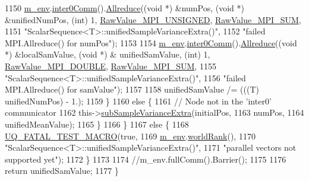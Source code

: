 \begin{DoxyCode}
1150       \hyperlink{class_q_u_e_s_o_1_1_scalar_sequence_a71618cd6351b29361b437af68447a4c8}{m\_env}.\hyperlink{class_q_u_e_s_o_1_1_base_environment_a689e4d140c74d495d97eb498714a4b82}{inter0Comm}().\hyperlink{class_q_u_e_s_o_1_1_mpi_comm_a72e137e60ef8060efb1ee5fc874fa4b8}{Allreduce}((\textcolor{keywordtype}{void} *) &numPos, (\textcolor{keywordtype}{void} *) &unifiedNumPos, (\textcolor{keywordtype}{int})
       1, \hyperlink{_mpi_comm_8h_a06cbfbc33436f6e0dc8a48ff3c49bdfc}{RawValue\_MPI\_UNSIGNED}, \hyperlink{_mpi_comm_8h_afbf78d291c032aa7f512bc566cee2bd1}{RawValue\_MPI\_SUM},
1151                                    \textcolor{stringliteral}{"ScalarSequence<T>::unifiedSampleVarianceExtra()"},
1152                                    \textcolor{stringliteral}{"failed MPI.Allreduce() for numPos"});
1153 
1154       \hyperlink{class_q_u_e_s_o_1_1_scalar_sequence_a71618cd6351b29361b437af68447a4c8}{m\_env}.\hyperlink{class_q_u_e_s_o_1_1_base_environment_a689e4d140c74d495d97eb498714a4b82}{inter0Comm}().\hyperlink{class_q_u_e_s_o_1_1_mpi_comm_a72e137e60ef8060efb1ee5fc874fa4b8}{Allreduce}((\textcolor{keywordtype}{void} *) &localSamValue, (\textcolor{keywordtype}{void} *) &
      unifiedSamValue, (\textcolor{keywordtype}{int}) 1, \hyperlink{_mpi_comm_8h_ad0f503bd9fecfe4e570ca3d15aaf2518}{RawValue\_MPI\_DOUBLE}, \hyperlink{_mpi_comm_8h_afbf78d291c032aa7f512bc566cee2bd1}{RawValue\_MPI\_SUM},
1155                                    \textcolor{stringliteral}{"ScalarSequence<T>::unifiedSampleVarianceExtra()"},
1156                                    \textcolor{stringliteral}{"failed MPI.Allreduce() for samValue"});
1157 
1158       unifiedSamValue /= (((T) unifiedNumPos) - 1.);
1159     \}
1160     \textcolor{keywordflow}{else} \{
1161       \textcolor{comment}{// Node not in the 'inter0' communicator}
1162       this->\hyperlink{class_q_u_e_s_o_1_1_scalar_sequence_a96aa7ad157eb648ffd65f99008609200}{subSampleVarianceExtra}(initialPos,
1163                                    numPos,
1164                                    unifiedMeanValue);
1165     \}
1166   \}
1167   \textcolor{keywordflow}{else} \{
1168     \hyperlink{_defines_8h_a56d63d18d0a6d45757de47fcc06f574d}{UQ\_FATAL\_TEST\_MACRO}(\textcolor{keyword}{true},
1169                         \hyperlink{class_q_u_e_s_o_1_1_scalar_sequence_a71618cd6351b29361b437af68447a4c8}{m\_env}.\hyperlink{class_q_u_e_s_o_1_1_base_environment_a78b57112bbd0e6dd0e8afec00b40ffa7}{worldRank}(),
1170                         \textcolor{stringliteral}{"ScalarSequence<T>::unifiedSampleVarianceExtra()"},
1171                         \textcolor{stringliteral}{"parallel vectors not supported yet"});
1172   \}
1173 
1174   \textcolor{comment}{//m\_env.fullComm().Barrier();}
1175 
1176   \textcolor{keywordflow}{return} unifiedSamValue;
1177 \}
\end{DoxyCode}
